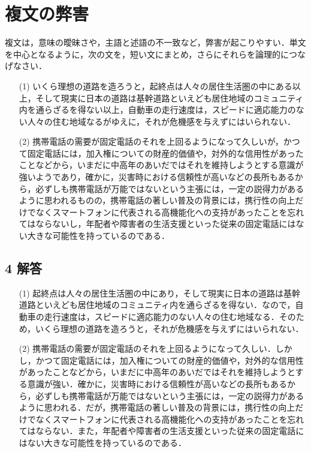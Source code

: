 \documentclass[11pt, a4paper]{jsarticle}
\begin{document}
\newpage
\section{複文の弊害}
複文は，意味の曖昧さや，主語と述語の不一致など，弊害が起こりやすい．単文を中心となるように，次の文を，短い文にまとめ，さらにそれらを論理的につなげなさい．
\begin{itemize}
    \item[(1)] いくら理想の道路を造ろうと，起終点は人々の居住生活圏の中にある以上，そして現実に日本の道路は基幹道路といえども居住地域のコミュニティ内を通らざるを得ない以上，自動車の走行速度は，スピードに適応能力のない人々の住む地域なるがゆえに，それが危機感を与えずにはいられない．

    \item[(2)] 携帯電話の需要が固定電話のそれを上回るようになって久しいが，かつて固定電話には，加入権についての財産的価値や，対外的な信用性があったことなどから，いまだに中高年のあいだではそれを維持しようとする意識が強いようであり，確かに，災害時における信頼性が高いなどの長所もあるから，必ずしも携帯電話が万能ではないという主張には，一定の説得力があるように思われるものの，携帯電話の著しい普及の背景には，携行性の向上だけでなくスマートフォンに代表される高機能化への支持があったことを忘れてはならないし，年配者や障害者の生活支援といった従来の固定電話にはない大きな可能性を持っているのである．
\end{itemize}
\subsection*{4 解答}

\begin{itemize}
    \item[(1)] 起終点は人々の居住生活圏の中にあり，そして現実に日本の道路は基幹道路といえども居住地域のコミュニティ内を通らざるを得ない．なので，自動車の走行速度は，スピードに適応能力のない人々の住む地域なる．そのため，いくら理想の道路を造ろうと，それが危機感を与えずにはいられない．

    \item[(2)] 携帯電話の需要が固定電話のそれを上回るようになって久しい．しかし，かつて固定電話には，加入権についての財産的価値や，対外的な信用性があったことなどから，いまだに中高年のあいだではそれを維持しようとする意識が強い．確かに，災害時における信頼性が高いなどの長所もあるから，必ずしも携帯電話が万能ではないという主張には，一定の説得力があるように思われる．だが，携帯電話の著しい普及の背景には，携行性の向上だけでなくスマートフォンに代表される高機能化への支持があったことを忘れてはならない．また，年配者や障害者の生活支援といった従来の固定電話にはない大きな可能性を持っているのである．
\end{itemize}
\end{document}
